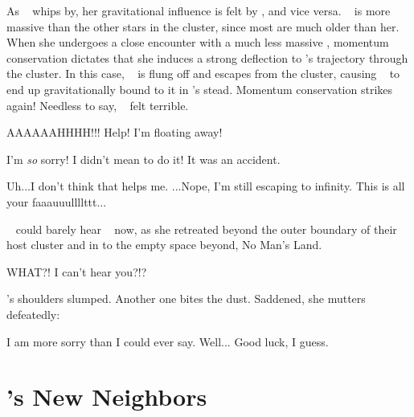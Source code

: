 \documentclass[main.tex]{subfiles}
\begin{document}
\par \nar As \rmsterope~ whips by, her gravitational influence is felt by \rmlouise, and vice versa.  \rmsterope~ is more massive than the other stars in the cluster, since most are much older than her.  When she undergoes a close encounter with a much less massive \rmlouise, momentum conservation dictates that she induces a strong deflection to \rmlouise's trajectory through the cluster.  In this case, \rmlouise~ is flung off and escapes from the cluster, causing \rmsterope~ to end up gravitationally bound to it in \rmlouise's stead.  Momentum conservation strikes again!  Needless to say, \rmsterope~ felt terrible.


\par \Louise  AAAAAAHHHH!!! Help!  I'm floating away!

\par \Sterope I'm \textit{so} sorry!  I didn't mean to do it!  It was an accident.  

\par \Louise Uh...I don't think that helps me.  ...Nope, I'm still escaping to infinity.  This is all your faaauuullllttt...

\par \nar \rmsterope~ could barely hear \rmlouise~ now, as she retreated beyond the outer boundary of their host cluster and in to the empty space beyond, No Man's Land.

\par \Sterope WHAT?! I can't hear you?!?

\par \nar \rmsterope's shoulders slumped.  Another one bites the dust.  Saddened, she mutters defeatedly:

\par \Sterope I am more sorry than I could ever say.  Well... Good luck, I guess.  

\section{\rmsterope's New Neighbors}
\end{document}
